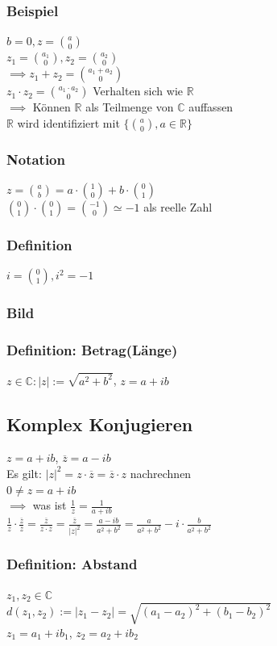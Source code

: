 \documentclass[fleqn]{scrbook}
\newcommand{\R}{\mathbb{R}}
\begin{document}
\subsubsection{Beispiel}
$b=0,z=\binom{a}{0}$\\$z_1=\binom{a_1}{0},z_2 = \binom{a_2}{0}$\\
$\implies z_1 + z_2 = \binom{a_1+a_2}{0}$\\
$z_1  \cdot  z_2 = \binom{a_1  \cdot  a_2}{0}$ Verhalten sich wie $\R$\\
$\implies$ Können $\R$ als Teilmenge von $\mathbb{C}$ auffassen\\
$\R$ wird identifiziert mit $\{\binom{a}{0}, a \in \R\}$
\subsubsection{Notation}
$z=\binom{a}{b}=a \cdot \binom{1}{0}+b \cdot \binom{0}{1}$\\
$\binom{0}{1}  \cdot  \binom{0}{1} = \binom{-1}{0} \simeq -1$ als reelle Zahl
\subsubsection{Definition} $i = \binom{0}{1}, i^2 = -1$
\subsubsection{Bild}
\subsubsection{Definition: Betrag(Länge)} 
$z \in \mathbb{C}:|z|:=\sqrt{a^2 + b^2}$, $z=a+ib$
\subsection{Komplex Konjugieren} $z = a+ib$, $\overline{z} = a - ib$\\
Es gilt: $|z|^2 = z  \cdot  \overline{z} = \overline{z}  \cdot  z$ nachrechnen\\
$0 \neq z = a + ib$\\
$\implies$ was ist $\frac{1}{z} = \frac{1}{a+ib}$\\
$\frac{1}{z}  \cdot  \frac{\overline{z}}{\overline{z}} = \frac{\overline{z}}{z  \cdot  \overline{z}} = \frac{\overline{z}}{|z|^2} = \frac{a-ib}{a^2 + b^2} = \frac{a}{a^2 + b^2} - i \cdot \frac{b}{a^2 + b^2}$
\subsubsection{Definition: Abstand} $z_1, z_2 \in \mathbb{C}$\\
$d(z_1,z_2) := |z_1 - z_2| = \sqrt{(a_1 - a_2)^2 + (b_1 - b_2)^2}$\\
$z_1 = a_1 + ib_1$, $z_2 = a_2 + ib_2$
\end{document}
